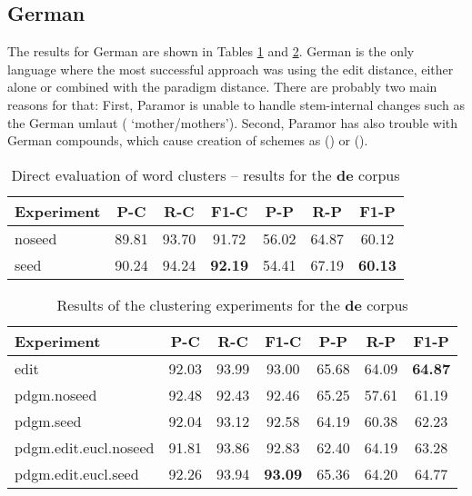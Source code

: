 \subsection{German}
The results for German are shown in Tables \ref{table:res:de:direct} and \ref{table:res:de:clust}. German is the only language where the most successful approach was using the edit distance, either alone or combined with the paradigm distance. There are probably two main reasons for that: First, Paramor is unable to handle stem-internal changes such as the German umlaut ( `mother/mothers'). Second, Paramor has also trouble with German compounds, which cause creation of schemes as () or ().
\begin{table}[p]
\begin{center}
\begin{tabular}{lcccccc}
\toprule
\bf Experiment & \bf P-C & \bf R-C & \bf F1-C & \bf P-P & \bf R-P & \bf F1-P\\
\midrule
noseed & 89.81 & 93.70 & 91.72 & 56.02 & 64.87 & 60.12\\
seed & 90.24 & 94.24 & \bf 92.19 & 54.41 & 67.19 & \bf 60.13\\
\bottomrule
\end{tabular}
\end{center}
\caption{\label{table:res:de:direct} Direct evaluation of word clusters -- results for the \textbf{de} corpus}
\end{table}

\begin{table}[p]
\begin{center}
\begin{tabular}{lcccccc}
\toprule
\bf Experiment & \bf P-C & \bf R-C & \bf F1-C & \bf P-P & \bf R-P & \bf F1-P\\
\midrule
edit & 92.03 & 93.99 & 93.00 & 65.68 & 64.09 & \bf 64.87\\
pdgm.noseed & 92.48 & 92.43 & 92.46 & 65.25 & 57.61 & 61.19\\
pdgm.seed & 92.04 & 93.12 & 92.58 & 64.19 & 60.38 & 62.23\\
pdgm.edit.eucl.noseed & 91.81 & 93.86 & 92.83 & 62.40 & 64.19 & 63.28\\
pdgm.edit.eucl.seed & 92.26 & 93.94 & \bf 93.09 & 65.36 & 64.20 & 64.77\\
\bottomrule
\end{tabular}
\end{center}
\caption{\label{table:res:de:clust} Results of the clustering experiments for the \textbf{de} corpus}
\end{table}


